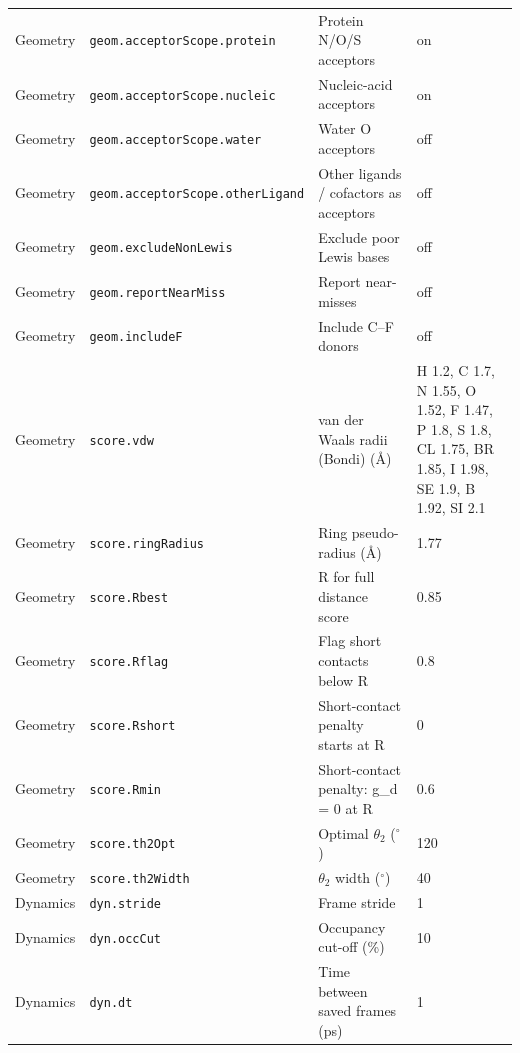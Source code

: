 {\begin{longtable}{llp{4.2cm}l}
Geometry & \texttt{geom.acceptorScope.protein} & Protein N/O/S acceptors & \parbox[t]{5.0cm}{\raggedright on}\\
Geometry & \texttt{geom.acceptorScope.nucleic} & Nucleic-acid acceptors & \parbox[t]{5.0cm}{\raggedright on}\\
Geometry & \texttt{geom.acceptorScope.water} & Water O acceptors & \parbox[t]{5.0cm}{\raggedright off}\\
Geometry & \texttt{geom.acceptorScope.otherLigand} & Other ligands / cofactors as acceptors & \parbox[t]{5.0cm}{\raggedright off}\\
Geometry & \texttt{geom.excludeNonLewis} & Exclude poor Lewis bases & \parbox[t]{5.0cm}{\raggedright off}\\
Geometry & \texttt{geom.reportNearMiss} & Report near-misses & \parbox[t]{5.0cm}{\raggedright off}\\
Geometry & \texttt{geom.includeF} & Include C--F donors & \parbox[t]{5.0cm}{\raggedright off}\\
Geometry & \texttt{score.vdw} & van der Waals radii (Bondi) (\AA{}) & \parbox[t]{5.0cm}{\raggedright H 1.2, C 1.7, N 1.55, O 1.52, F 1.47, P 1.8, S 1.8, CL 1.75, BR 1.85, I 1.98, SE 1.9, B 1.92, SI 2.1}\\
Geometry & \texttt{score.ringRadius} & Ring pseudo-radius (\AA{}) & \parbox[t]{5.0cm}{\raggedright 1.77}\\
Geometry & \texttt{score.Rbest} & R for full distance score & \parbox[t]{5.0cm}{\raggedright 0.85}\\
Geometry & \texttt{score.Rflag} & Flag short contacts below R & \parbox[t]{5.0cm}{\raggedright 0.8}\\
Geometry & \texttt{score.Rshort} & Short-contact penalty starts at R & \parbox[t]{5.0cm}{\raggedright 0}\\
Geometry & \texttt{score.Rmin} & Short-contact penalty: g\_d = 0 at R & \parbox[t]{5.0cm}{\raggedright 0.6}\\
Geometry & \texttt{score.th2Opt} & Optimal $\theta_2$ ($^\circ$) & \parbox[t]{5.0cm}{\raggedright 120}\\
Geometry & \texttt{score.th2Width} & $\theta_2$ width ($^\circ$) & \parbox[t]{5.0cm}{\raggedright 40}\\
Dynamics & \texttt{dyn.stride} & Frame stride & \parbox[t]{5.0cm}{\raggedright 1}\\
Dynamics & \texttt{dyn.occCut} & Occupancy cut-off (\%) & \parbox[t]{5.0cm}{\raggedright 10}\\
Dynamics & \texttt{dyn.dt} & Time between saved frames (ps) & \parbox[t]{5.0cm}{\raggedright 1}\\

\end{longtable}}
